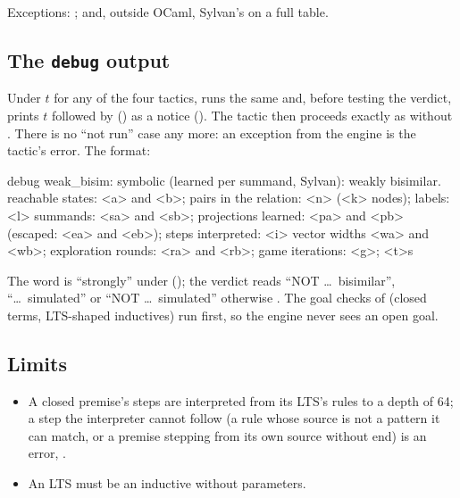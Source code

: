 Exceptions: ; and, outside OCaml, Sylvan's
 on a full table.

\subsection{The \texttt{debug} output}\label{sec:sym-debug}

Under  $t$ for any of the four tactics,  runs the
same  and, before testing the
verdict, prints $t$\code{: } followed by  () as a notice
(). The tactic then proceeds exactly as
without . There is no ``not run'' case any more: an exception
from the engine is the tactic's error. The format:
\begin{shell}
debug weak_bisim: symbolic (learned per summand, Sylvan): weakly bisimilar.
  reachable states: <a> and <b>; pairs in the relation: <n> (<k> nodes); labels: <l>
  summands: <sa> and <sb>; projections learned: <pa> and <pb> (escaped: <ea> and <eb>); steps interpreted: <i>
  vector widths <wa> and <wb>; exploration rounds: <ra> and <rb>; game iterations: <g>; <t>s
\end{shell}
The word is ``strongly'' under 
(); the verdict reads ``NOT \ldots\
bisimilar'', ``\ldots\ simulated'' or ``NOT \ldots\ simulated'' otherwise
. The goal checks of \code{prove}
(closed terms, LTS-shaped inductives) run first, so the engine never sees
an open goal.

\subsection{Limits}\label{sec:sym-limits}

\begin{itemize}
\item A closed premise's steps are interpreted from its LTS's rules to a
  depth of 64; a step the interpreter cannot follow (a rule whose source
  is not a pattern it can match, or a premise stepping from its own source
  without end) is an error, \code{Learn.Unfollowable}.
\item An LTS must be an inductive  without
  parameters.
\end{itemize}

\endgroup
